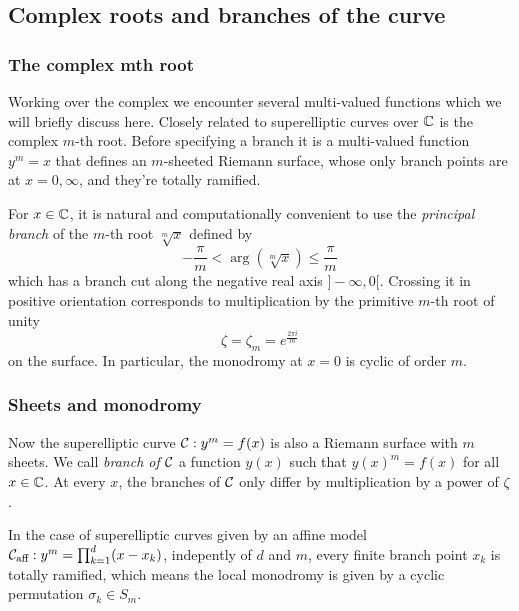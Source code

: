 \documentclass[main.tex]{subfiles}
\begin{document}
  \subsection{Complex roots and branches of the curve}\label{subsec:roots_branches}

  \subsubsection{The complex mth root}

  Working over the complex we encounter several multi-valued functions
  which we will briefly discuss here.  Closely related to superelliptic
  curves over $\mathbb{C}$ is the complex $m$-th root.
  Before specifying a branch it is a multi-valued function $y^m = x$
  that defines an $m$-sheeted Riemann surface, whose only branch points
  are at $x = 0,\infty$, and they're totally ramified.

  For $x\in\mathbb{C}$, it is natural and computationally convenient to use the
  \emph{principal branch} of the $m$-th root $\sqrt[m]x$ defined by
  \begin{equation}
      \label{eq:principal_mth_root}
      -\frac{π}m<\arg(\sqrt[m]x)\leq\frac{π}m
  \end{equation}
  which has a branch cut along the negative real axis $]\!-\infty,0[$.
  Crossing it in positive orientation corresponds to multiplication by
  the primitive $m$-th root of unity
  \begin{equation}
      \label{eq:zeta}
  \zeta = \zeta_m = e^{\frac{2\pi i }{m}}
  \end{equation}
  on the surface. In
  particular, the monodromy at $x=0$ is cyclic of order $m$.

  \subsubsection{Sheets and monodromy}

  Now the superelliptic curve $\mathcal{C}:y^m=f(x)$ is also a Riemann surface with
  $m$ sheets.
  We call \emph{branch of $\mathcal{C}$} a function $y(x)$ such that
  $y(x)^m = f(x)$ for all $x \in \mathbb{C}$. At every $x$, the branches of $\mathcal{C}$ only
  differ by multiplication by a power of $\zeta$.

  In the case of superelliptic curves given
  by an affine model $\mathcal{C}_{\text{aff}} : y^m = \prod_{k = 1}^d (x - x_k)$, indepently of
  $d$ and $m$, every finite branch point $x_k$ is totally ramified, which means
  the local monodromy is given by a cyclic permutation $\sigma_k \in S_m$.
\end{document}

